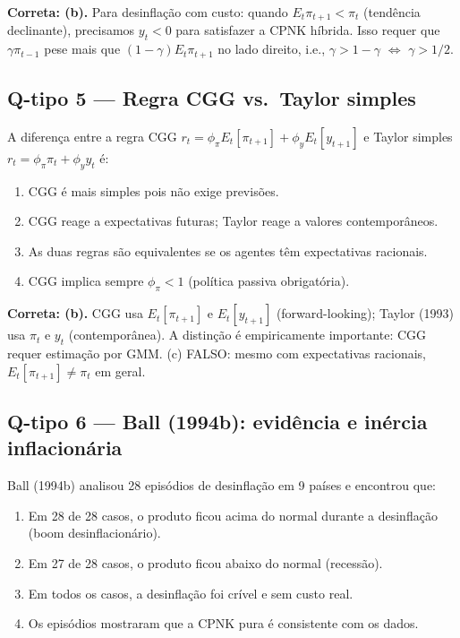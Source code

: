 \documentclass[12pt, a4paper]{article}
\begin{document}
\begin{resultbox}[title={Gabarito: (b)}]
\textbf{Correta: (b).} Para desinflação com custo: quando $E_t\pi_{t+1} < \pi_t$ (tendência declinante), precisamos $y_t < 0$ para satisfazer a CPNK híbrida. Isso requer que $\gamma\pi_{t-1}$ pese mais que $(1-\gamma)E_t\pi_{t+1}$ no lado direito, i.e., $\gamma > 1-\gamma$ $\Leftrightarrow$ $\gamma > 1/2$.
\end{resultbox}

\subsection*{Q-tipo 5 --- Regra CGG vs.\ Taylor simples}

A diferença entre a regra CGG $r_t = \phi_\pi E_t[\pi_{t+1}] + \phi_y E_t[y_{t+1}]$ e Taylor simples $r_t = \phi_\pi\pi_t + \phi_y y_t$ é:

\begin{enumerate}[label=(\alph*)]
  \item CGG é mais simples pois não exige previsões.
  \item CGG reage a expectativas futuras; Taylor reage a valores contemporâneos.
  \item As duas regras são equivalentes se os agentes têm expectativas racionais.
  \item CGG implica sempre $\phi_\pi < 1$ (política passiva obrigatória).
\end{enumerate}

\begin{resultbox}[title={Gabarito: (b)}]
\textbf{Correta: (b).} CGG usa $E_t[\pi_{t+1}]$ e $E_t[y_{t+1}]$ (forward-looking); Taylor (1993) usa $\pi_t$ e $y_t$ (contemporânea). A distinção é empiricamente importante: CGG requer estimação por GMM. (c) FALSO: mesmo com expectativas racionais, $E_t[\pi_{t+1}] \neq \pi_t$ em geral.
\end{resultbox}

\subsection*{Q-tipo 6 --- Ball (1994b): evidência e inércia inflacionária}

Ball (1994b) analisou 28 episódios de desinflação em 9 países e encontrou que:

\begin{enumerate}[label=(\alph*)]
  \item Em 28 de 28 casos, o produto ficou acima do normal durante a desinflação (boom desinflacionário).
  \item Em 27 de 28 casos, o produto ficou abaixo do normal (recessão).
  \item Em todos os casos, a desinflação foi crível e sem custo real.
  \item Os episódios mostraram que a CPNK pura é consistente com os dados.
\end{enumerate}
\end{document}
